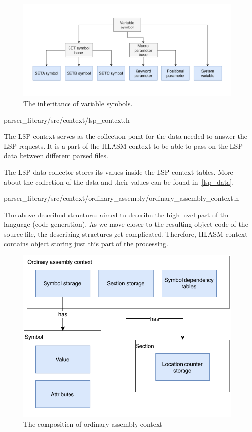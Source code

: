 \begin{figure}
	\centering
	\includegraphics[width=\textwidth]{img/variable_arch}
	\caption{The inheritance of variable symbols.}
	\label{fig06:var}
\end{figure}

{parser\_library/src/context/lsp\_context.h}

The LSP context serves as the collection point for the data needed to answer the LSP requests. It is a part of the HLASM context to be able to pass on the LSP data between different parsed files.

The LSP data collector stores its values inside the LSP context tables. More about the collection of the data and their values can be found in~\cref{lsp_data}.

{parser\_library/src/context/ordinary\_assembly/ordinary\_assembly\_context.h}

The above described structures aimed to describe the high-level part of the language (code generation). As we move closer to the resulting object code of the source file, the describing structures get complicated. Therefore, HLASM context contains object storing just this part of the processing.

\begin{figure}
	\centering
	\includegraphics[width=\textwidth]{img/ord_ctx_arch}
	\caption{The composition of ordinary assembly context}
	\label{fig06:ord_ctx}
\end{figure}

